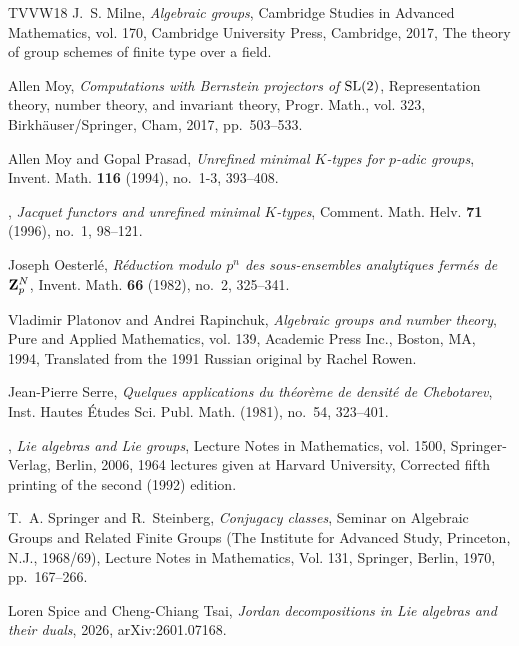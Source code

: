 \documentclass[11pt,reqno]{amsart}
\numberwithin{equation}{section}
\theoremstyle{plain}
\theoremstyle{definition}
\theoremstyle{remark}
\theoremstyle{plain}
\begin{document}
\begin{thebibliography}{TVVW18}
J.~S. Milne, \emph{Algebraic groups}, Cambridge Studies in Advanced
  Mathematics, vol. 170, Cambridge University Press, Cambridge, 2017, The
  theory of group schemes of finite type over a field. 

Allen Moy, \emph{Computations with {B}ernstein projectors of {${\rm SL}(2)$}},
  Representation theory, number theory, and invariant theory, Progr. Math.,
  vol. 323, Birkh\"auser/Springer, Cham, 2017, pp.~503--533. 

Allen Moy and Gopal Prasad, \emph{Unrefined minimal {$K$}-types for {$p$}-adic
  groups}, Invent. Math. \textbf{116} (1994), no.~1-3, 393--408. 

\bysame, \emph{Jacquet functors and unrefined minimal {$K$}-types}, Comment.
  Math. Helv. \textbf{71} (1996), no.~1, 98--121. 

Joseph Oesterl{\'e}, \emph{R\'eduction modulo {$p^{n}$} des sous-ensembles
  analytiques ferm\'es de {${\bf Z}^{N}_{p}$}}, Invent. Math. \textbf{66}
  (1982), no.~2, 325--341. 

Vladimir Platonov and Andrei Rapinchuk, \emph{Algebraic groups and number
  theory}, Pure and Applied Mathematics, vol. 139, Academic Press Inc., Boston,
  MA, 1994, Translated from the 1991 Russian original by Rachel Rowen.

Jean-Pierre Serre, \emph{Quelques applications du th\'eor\`eme de densit\'e de
  {C}hebotarev}, Inst. Hautes \'Etudes Sci. Publ. Math. (1981), no.~54,
  323--401. 

\bysame, \emph{Lie algebras and {L}ie groups}, Lecture Notes in Mathematics,
  vol. 1500, Springer-Verlag, Berlin, 2006, 1964 lectures given at Harvard
  University, Corrected fifth printing of the second (1992) edition.

T.~A. Springer and R.~Steinberg, \emph{Conjugacy classes}, Seminar on
  {A}lgebraic {G}roups and {R}elated {F}inite {G}roups ({T}he {I}nstitute for
  {A}dvanced {S}tudy, {P}rinceton, {N}.{J}., 1968/69), Lecture Notes in
  Mathematics, Vol. 131, Springer, Berlin, 1970, pp.~167--266. 

Loren Spice and Cheng-Chiang Tsai, \emph{Jordan decompositions in {Lie}
  algebras and their duals}, 2026, arXiv:2601.07168.


\end{thebibliography}
\end{document}
